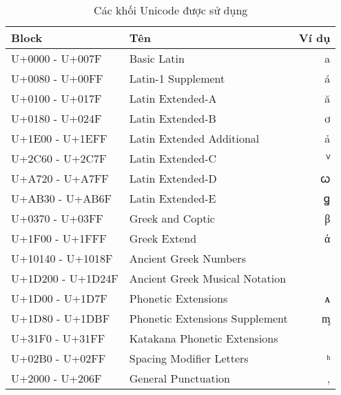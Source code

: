 \begin{table}[htb]
    \centering
    \caption{Các khối Unicode được sử dụng}
    \label{table:unicode-blocks}
    \begin{threeparttable}
        \begin{tabular}{llr}
            \toprule
            \textbf{Block}    & \textbf{Tên}                            & \textbf{Ví dụ} \\\midrule
            U+0000 - U+007F   & Basic Latin                             & a              \\
            U+0080 - U+00FF   & Latin-1 Supplement                      & á              \\
            U+0100 - U+017F   & Latin Extended-A                        & ă              \\
            U+0180 - U+024F   & Latin Extended-B                        & ơ              \\
            U+1E00 - U+1EFF   & Latin Extended Additional               & ả              \\
            U+2C60 - U+2C7F   & Latin Extended-C                        & ⱽ              \\
            U+A720 - U+A7FF   & Latin Extended-D                        & ꞷ              \\
            U+AB30 - U+AB6F   & Latin Extended-E                        & ꬶ              \\
            U+0370 - U+03FF   & Greek and Coptic                        & β              \\
            U+1F00 - U+1FFF   & Greek Extend                            & ἀ              \\
            U+10140 - U+1018F & Ancient Greek Numbers\tnote{1}          &                \\
            U+1D200 - U+1D24F & Ancient Greek Musical Notation\tnote{2} &                \\
            U+1D00 - U+1D7F   & Phonetic Extensions                     & ᴀ              \\
            U+1D80 - U+1DBF   & Phonetic Extensions Supplement          & ᶆ              \\
            U+31F0 - U+31FF   & Katakana Phonetic Extensions\tnote{3}   &                \\
            U+02B0 - U+02FF   & Spacing Modifier Letters                & ʰ              \\
            U+2000 - U+206F   & General Punctuation                     & ‚              \\

\end{tabular}
\end{threeparttable}
\end{table}
